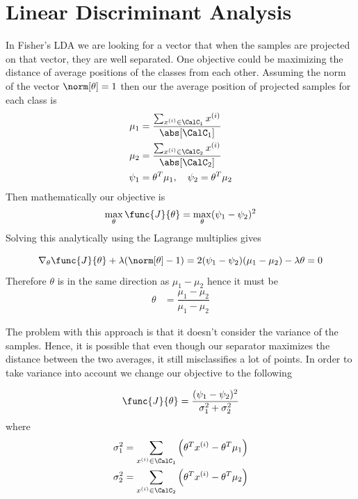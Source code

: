  \section{Linear Discriminant Analysis}
 In Fisher's LDA we are looking for a vector that when the samples are projected on that vector, they are well separated. One objective could be maximizing the distance of average positions of the classes from each other. Assuming the norm of the vector  \(\norm[\theta] = 1\) then our the average position of projected samples for each class is 
 \begin{align*}
     \mu_1 &= \dfrac{\sum_{x^{(i)} \in \CalC_1} x^{(i)}}{\abs[\CalC_1]}\\
     \mu_2 &=\dfrac{\sum_{x^{(i)} \in \CalC_2} x^{(i)}}{\abs[\CalC_2]}\\
     \psi_1 &=  \theta^T \mu_1 , \quad \psi_2 = \theta^T \mu_2
 \end{align*}
 Then mathematically our objective is 
 \begin{equation*}
     \max_{\theta} \func{J}{\theta} = \max_{\theta} (\psi_1 - \psi_2)^2
 \end{equation*}
 Solving this analytically using the Lagrange multiplies gives 

\begin{equation*}
    \nabla_{\theta} \func{J}{\theta} + \lambda (\norm[\theta] - 1) = 2 (\psi_1 - \psi_2)(\mu_1 - \mu_2) - \lambda \theta = 0
\end{equation*}
Therefore \(\theta\) is in the same direction as \(\mu_1 - \mu_2\) hence it must be  
\begin{align*}
    \theta &= \dfrac{\mu_1 - \mu_2}{\mu_1 - \mu_2}
\end{align*}

The problem with this approach is that it doesn't consider the variance of the samples. Hence, it is possible that even though our separator maximizes the distance between the two averages, it still misclassifies a lot of points. In order to take variance into account we change our objective to the following

\begin{equation*}
    \func{J}{\theta} = \dfrac{(\psi_1 - \psi_2)^2}{\sigma_1^2 + \sigma_2^2}
\end{equation*}
where 
\begin{align*}
    \sigma_1^2 &= \sum_{x^{(i)} \in \CalC_1} \left(\theta^T x^{(i)} - \theta^T \mu_1 \right)\\
    \sigma_2^2 &= \sum_{x^{(i)} \in \CalC_2} \left(\theta^T x^{(i)} - \theta^T \mu_2 \right)
\end{align*}

